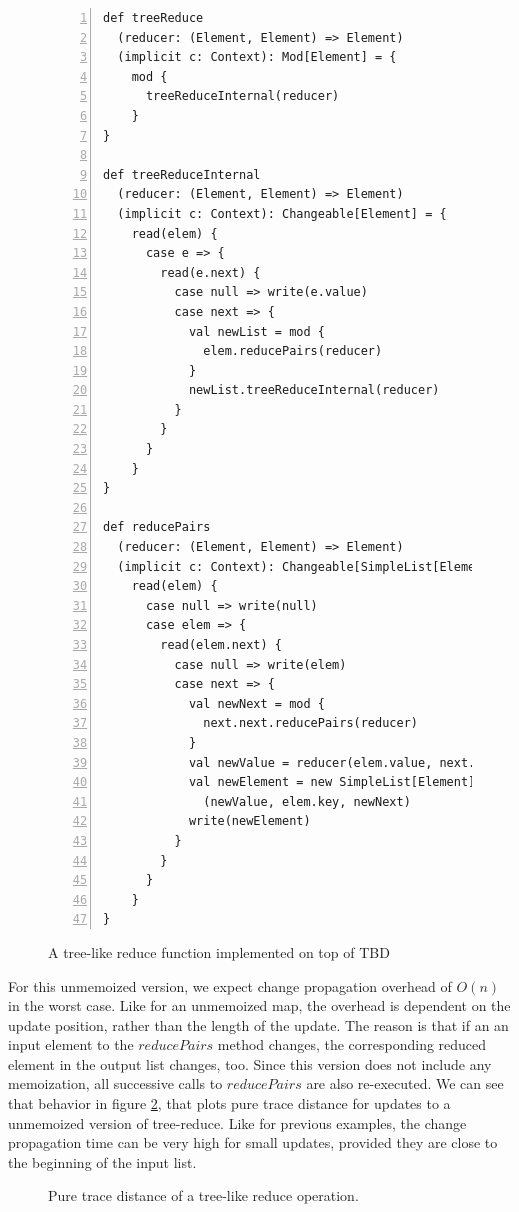 \begin{figure}
\begin{lstlisting}[frame=single,basicstyle=\ttfamily,numbers=left,mathescape=true]
def treeReduce
  (reducer: (Element, Element) => Element)
  (implicit c: Context): Mod[Element] = {
    mod {
      treeReduceInternal(reducer)
    }
}

def treeReduceInternal
  (reducer: (Element, Element) => Element)
  (implicit c: Context): Changeable[Element] = {
    read(elem) {
      case e => {
        read(e.next) {
          case null => write(e.value)
          case next => {
            val newList = mod {
              elem.reducePairs(reducer)
            }
            newList.treeReduceInternal(reducer)
          }
        }
      }
    }
}

def reducePairs
  (reducer: (Element, Element) => Element)
  (implicit c: Context): Changeable[SimpleList[Element]] = {
    read(elem) {
      case null => write(null)
      case elem => {
        read(elem.next) {
          case null => write(elem)
          case next => {
            val newNext = mod {
              next.next.reducePairs(reducer)
            }
            val newValue = reducer(elem.value, next.value)
            val newElement = new SimpleList[Element]
              (newValue, elem.key, newNext)
            write(newElement)
          }
        }
      }
    }
}

\end{lstlisting}
\caption{A tree-like reduce function implemented on top of TBD}
\label{code:tree_reduce}
\end{figure}

For this unmemoized version, we expect change propagation overhead of $O(n)$ in the worst case. Like for an unmemoized map, the overhead is dependent on the update position, rather than the length of the update. The reason is that if an an input element to the $reducePairs$ method changes, the corresponding reduced element in the output list changes, too. Since this version does not include any memoization, all successive calls to $reducePairs$ are also re-executed. We can see that behavior in figure \ref{plot:tree_reduce_pure}, that plots pure trace distance for updates to a unmemoized version of tree-reduce. Like for previous examples, the change propagation time can be very high for small updates, provided they are close to the beginning of the input list. 

\begin{figure}
\centering
{}
\caption{Pure trace distance of a tree-like reduce operation.}
\label{plot:tree_reduce_pure}
\end{figure}

